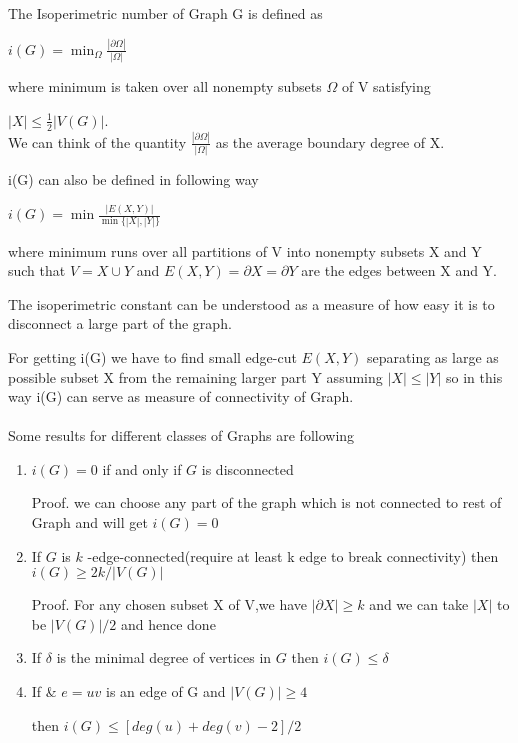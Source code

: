 \documentclass[oneside]{book}
\theoremstyle{definition}
\begin{document}
           
           The Isoperimetric number of Graph G is defined as \par
           \begin{center}
               $i(G)=\min _{\Omega} \frac{|\partial \Omega|}{|\Omega|}$
           \end{center}
           where minimum is taken over all nonempty subsets $\Omega$ of V satisfying\par $|X| \leq \frac{1}{2}|V(G)|$.
\\           We can think of the quantity  $\frac{|\partial \Omega|}{|\Omega|}$ as the average boundary degree of X. \par
           i(G) can also be defined in following way \par
           \begin{center}
               $i(G)=\min \frac{|E(X, Y)|}{\min \{|X|,|Y|\}}$
           \end{center}
            where minimum runs over all partitions of V into nonempty subsets X and Y such that  $V=X \cup Y$ and $E(X, Y)=\partial X=\partial Y$ are the edges between X and Y.
           \par
           The isoperimetric constant can be understood as a measure of how easy
it is to disconnect a large part of the graph. \par
           For getting i(G) we have to find small edge-cut $E(X, Y)$ separating as large as possible  subset X from the remaining larger part Y assuming $|X|\leq |Y|$ so in this way i(G) can serve as measure of connectivity of Graph. \\\\
           Some results for different classes of Graphs are following \par
           \begin{enumerate}
             
          
               \item  $i(G)=0$ if and only if $G$ is disconnected \par
               Proof. we can choose  any part of the graph which is not connected to rest of Graph and will get $i(G)=0$ \par
               \item  If $G$ is $k$ -edge-connected(require at least k edge to break connectivity) then $i(G) \geq 2 k /|V(G)|$ \par
        Proof. For any chosen subset X of V,we have  $|\partial X| \geq k$ and we can take $|X|$ to be $|V(G)|/2$ and hence done\par
        \item  If $\delta$ is the minimal degree of vertices in $G$ then $i(G) \leq\delta$ \par
        \item  If  & $e=u v$ is   an  edge  of G  and $|V(G)| \geq 4$ \par then  $i(G) \leq [deg(u)+deg(v)-2] / 2$ \par
            \end{enumerate}
          
\end{document}
